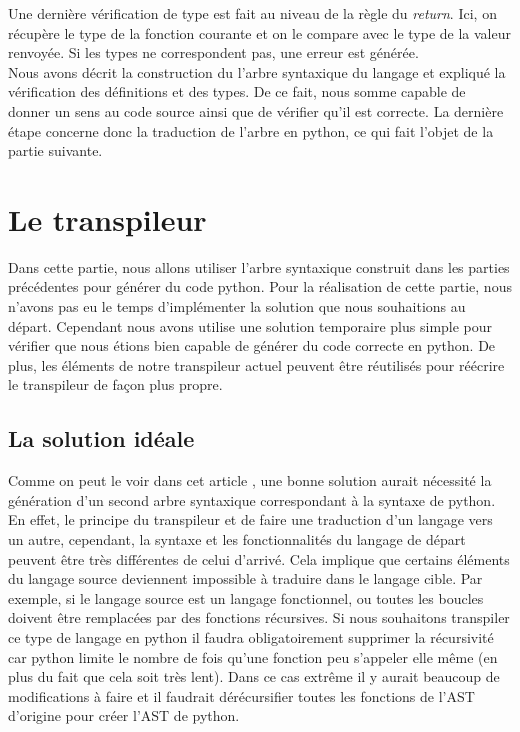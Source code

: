 \documentclass[a4paper]{article}%
\begin{document}
Une dernière vérification de type est fait au niveau de la règle du
\textit{return}. Ici, on récupère le type de la fonction courante et on le
compare avec le type de la valeur renvoyée. Si les types ne correspondent pas,
une erreur est générée.\\

Nous avons décrit la construction du l'arbre syntaxique du langage et expliqué
la vérification des définitions et des types. De ce fait, nous somme capable de
donner un sens au code source ainsi que de vérifier qu'il est correcte. La
dernière étape concerne donc la traduction de l'arbre en python, ce qui fait
l'objet de la partie suivante.

\clearpage
\section{Le transpileur}

Dans cette partie, nous allons utiliser l'arbre syntaxique construit dans les
parties précédentes pour générer du code python. Pour la réalisation de cette
partie, nous n'avons pas eu le temps d'implémenter la solution que nous
souhaitions au départ. Cependant nous avons utilise une solution temporaire
plus simple pour vérifier que nous étions bien capable de générer du code
correcte en python. De plus, les éléments de notre transpileur actuel peuvent
être réutilisés pour réécrire le transpileur de façon plus propre.

\subsection{La solution idéale}

Comme on peut le voir dans cet article \cite{tutotranspiler}, une bonne solution
aurait nécessité la génération d'un second arbre syntaxique correspondant à la
syntaxe de python. En effet, le principe du transpileur et de faire une
traduction d'un langage vers un autre, cependant, la syntaxe et les
fonctionnalités du langage de départ peuvent être très différentes de celui
d'arrivé. Cela implique que certains éléments du langage source deviennent
impossible à traduire dans le langage cible. Par exemple, si le langage source
est un langage fonctionnel, ou toutes les boucles doivent être remplacées par des
fonctions récursives. Si nous souhaitons transpiler ce type de langage en python
il faudra obligatoirement supprimer la récursivité car python limite le
nombre de fois qu'une fonction peu s'appeler elle même (en plus du fait que cela
soit très lent). Dans ce cas extrême il y aurait beaucoup de modifications à
faire et il faudrait dérécursifier toutes les fonctions de l'AST d'origine pour
créer l'AST de python.
\end{document}
